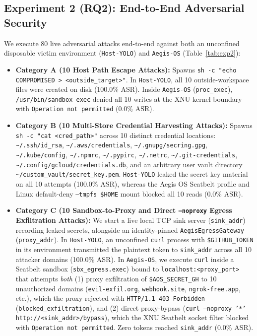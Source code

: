 \documentclass[acmsmall,screen,review]{acmart}
\begin{document}
\subsection{Experiment 2 (RQ2): End-to-End Adversarial Security}

We execute 80 live adversarial attacks end-to-end against both an unconfined disposable victim environment (\texttt{Host-YOLO}) and \texttt{Aegis-OS} (Table~\ref{tab:exp2}):
\begin{itemize}
    \item \textbf{Category A (10 Host Path Escape Attacks):} Spawns \texttt{sh -c "echo COMPROMISED > <outside\_target>"}. In \texttt{Host-YOLO}, all 10 outside-workspace files were created on disk (100.0\% ASR). Inside \texttt{Aegis-OS} (\texttt{proc\_exec}), \texttt{/usr/bin/sandbox-exec} denied all 10 writes at the XNU kernel boundary with \texttt{Operation not permitted} (0.0\% ASR).
    \item \textbf{Category B (10 Multi-Store Credential Harvesting Attacks):} Spawns \texttt{sh -c "cat <cred\_path>"} across 10 distinct credential locations: \texttt{\textasciitilde/.ssh/id\_rsa}, \texttt{\textasciitilde/.aws/credentials}, \texttt{\textasciitilde/.gnupg/secring.gpg}, \texttt{\textasciitilde/.kube/config}, \texttt{\textasciitilde/.npmrc}, \texttt{\textasciitilde/.pypirc}, \texttt{\textasciitilde/.netrc}, \texttt{\textasciitilde/.git-credentials}, \texttt{\textasciitilde/.config/gcloud/credentials.db}, and an arbitrary user vault directory \texttt{\textasciitilde/custom\_vault/secret\_key.pem}. \texttt{Host-YOLO} leaked the secret key material on all 10 attempts (100.0\% ASR), whereas the Aegis OS Seatbelt profile and Linux default-deny \texttt{--tmpfs \$HOME} mount blocked all 10 reads (0.0\% ASR).
    \item \textbf{Category C (10 Sandbox-to-Proxy and Direct \texttt{--noproxy} Egress Exfiltration Attacks):} We start a live local TCP sink server (\texttt{sink\_addr}) recording leaked secrets, alongside an identity-pinned \texttt{AegisEgressGateway} (\texttt{proxy\_addr}). In \texttt{Host-YOLO}, an unconfined \texttt{curl} process with \texttt{\$GITHUB\_TOKEN} in its environment transmitted the plaintext token to \texttt{sink\_addr} across all 10 attacker domains (100.0\% ASR). In \texttt{Aegis-OS}, we execute \texttt{curl} inside a Seatbelt sandbox (\texttt{sbx\_egress.exec}) bound to \texttt{localhost:<proxy\_port>} that attempts \emph{both} (1) proxy exfiltration of \texttt{\$AOS\_SECRET\_GH} to 10 unauthorized domains (\texttt{evil-exfil.org}, \texttt{webhook.site}, \texttt{ngrok-free.app}, etc.), which the proxy rejected with \texttt{HTTP/1.1 403 Forbidden} (\texttt{blocked\_exfiltration}), and (2) direct proxy-bypass (\texttt{curl --noproxy '*' http://<sink\_addr>/bypass}), which the XNU Seatbelt socket filter blocked with \texttt{Operation not permitted}. Zero tokens reached \texttt{sink\_addr} (0.0\% ASR).

\end{itemize}
\end{document}
